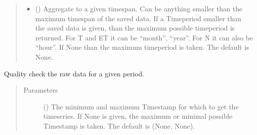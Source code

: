 \documentclass[letterpaper,10pt,english]{sphinxmanual}
\begin{document}
\begin{fulllineitems}
\begin{fulllineitems}
\begin{quote}
\begin{description}
\begin{itemize}
\item {} 
\sphinxAtStartPar
{} (\sphinxstyleliteralemphasis{\sphinxupquote{, }}) \textendash{} Aggregate to a given timespan.
Can be anything smaller than the maximum timespan of the saved data.
If a Timeperiod smaller than the saved data is given, than the maximum possible timeperiod is returned.
For T and ET it can be “month”, “year”.
For N it can also be “hour”.
If None than the maximum timeperiod is taken.
The default is None.

\end{itemize}

\end{description}\end{quote}

\end{fulllineitems}


\begin{fulllineitems}
\label{\detokenize{weatherDB:weatherDB.station.StationBase.quality_check}}
\sphinxAtStartPar
Quality check the raw data for a given period.
\begin{quote}\begin{description}
\item[{Parameters}] \leavevmode
\sphinxAtStartPar
{} (\sphinxstyleliteralemphasis{\sphinxupquote{(}}\sphinxstyleliteralemphasis{\sphinxupquote{)}}\sphinxstyleliteralemphasis{\sphinxupquote{, }}) \textendash{} The minimum and maximum Timestamp for which to get the timeseries.
If None is given, the maximum or minimal possible Timestamp is taken.
The default is (None, None).


\end{description}
\end{quote}
\end{fulllineitems}
\end{fulllineitems}
\end{document}
